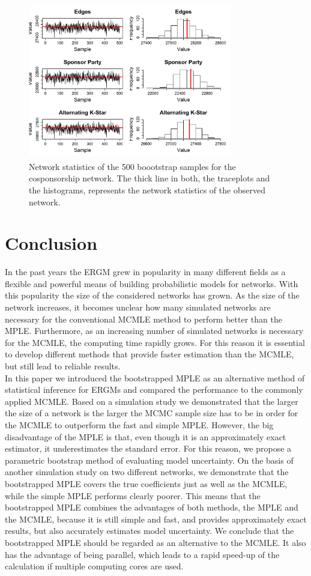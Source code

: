 \documentclass{llncs}
\begin{document}
\begin{figure}[!t]
\centering
\includegraphics[width=3.5in, height=2.7in]{MPLE_histogram_traceplot_cosponsorship}
\caption{Network statistics of the 500 boootstrap samples for the cosponsorship network. The thick line in both, the traceplots and the histograms, represents the network statistics of the observed network. }
\label{diagnostics}
\end{figure}

\section{Conclusion}
In the past years the ERGM grew in popularity in many different fields as a flexible and powerful means of building probabilistic models for networks. With this popularity the size of the considered networks has grown. As the size of the network increases, it becomes unclear how many simulated networks are necessary for the conventional MCMLE method to perform better than the MPLE. Furthermore, as an increasing number of simulated networks is necessary for the MCMLE, the computing time rapidly grows. For this reason it is essential to develop different methods that provide faster estimation than the MCMLE, but still lead to reliable results.\\
In this paper we introduced the bootstrapped MPLE as an alternative method of statistical inference for ERGMs and compared the performance to the commonly applied MCMLE. Based on a simulation study we demonstrated that the larger the size of a network is the larger the MCMC sample size has to be in order for the MCMLE to outperform the fast and simple MPLE. However, the big disadvantage of the MPLE is that, even though it is an approximately exact estimator, it underestimates the standard error. For this reason, we propose a parametric bootstrap method of evaluating model uncertainty. On the basis of another simulation study on two different networks, we demonstrate that the bootstrapped MPLE covers the true coefficients just as well as the MCMLE, while the simple MPLE performs clearly poorer. This means that the bootstrapped MPLE combines the advantages of both methods, the MPLE and the MCMLE, because it is still simple and fast, and provides approximately exact results, but also accurately estimates model uncertainty. We conclude that the bootstrapped MPLE should be regarded as an alternative to the MCMLE. It also has the advantage of being parallel, which leads to a rapid speed-up of the calculation if multiple computing cores are used.
\end{document}
